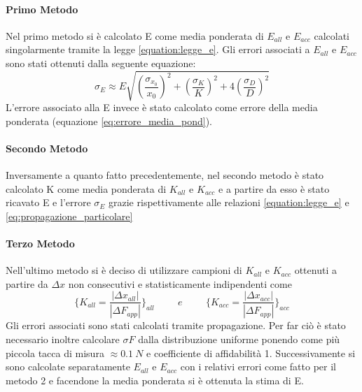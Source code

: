 \documentclass[a4paper,11pt,oneside]{article}
\begin{document}
\paragraph{Primo Metodo} Nel primo metodo si è calcolato E come media ponderata di $E_{all}$ e $E_{acc}$ calcolati singolarmente tramite la legge \ref{equation:legge_e}. Gli errori associati a $E_{all}$ e $E_{acc}$ sono stati ottenuti dalla seguente equazione:
\begin{equation*}
    \sigma_{E} \approx E\sqrt{\left(\frac{\sigma_{x_{0}}}{x_{0}}\right)^2+\left(\frac{\sigma_{K}}{K}\right)^2+4\left(\frac{\sigma_{D}}{D}\right)^2}
    \label{eq:propagazione_particolare}
\end{equation*}
L'errore associato alla E invece è stato calcolato come errore della media ponderata (equazione \ref{eq:errore_media_pond}).

\paragraph{Secondo Metodo} Inversamente a quanto fatto precedentemente, nel secondo metodo è stato calcolato K come media ponderata di $K_{all}$ e $K_{acc}$ e a partire da esso è stato ricavato E e l'errore $\sigma_{E}$ grazie rispettivamente alle relazioni \ref{equation:legge_e} e \ref{eq:propagazione_particolare}

\paragraph{Terzo Metodo} Nell'ultimo metodo si è deciso di utilizzare campioni di $K_{all}$ e $K_{acc}$ ottenuti a partire da $\Delta x$  non consecutivi e statisticamente indipendenti come 
\begin{equation*}
    \biggl\{ K_{all} = \frac{|\Delta x_{all}|}{|\Delta F_{app}|}\biggr\}_{all}
    \hspace{1cm} e \hspace{1cm}
    \biggl\{ K_{acc} = \frac{|\Delta x_{acc}|}{|\Delta F_{app}|}\biggr\}_{acc}
\end{equation*}
Gli errori associati sono stati calcolati tramite propagazione. Per far ciò è stato necessario inoltre calcolare $\sigma F$ dalla distribuzione uniforme ponendo come più piccola tacca di misura $\approx \SI{0.1}{N}$ e coefficiente di affidabilità 1. Successivamente si sono calcolate separatamente $E_{all}$ e $E_{acc}$ con i relativi errori come fatto per il metodo 2 e facendone la media ponderata si è ottenuta la stima di E.
\end{document}
